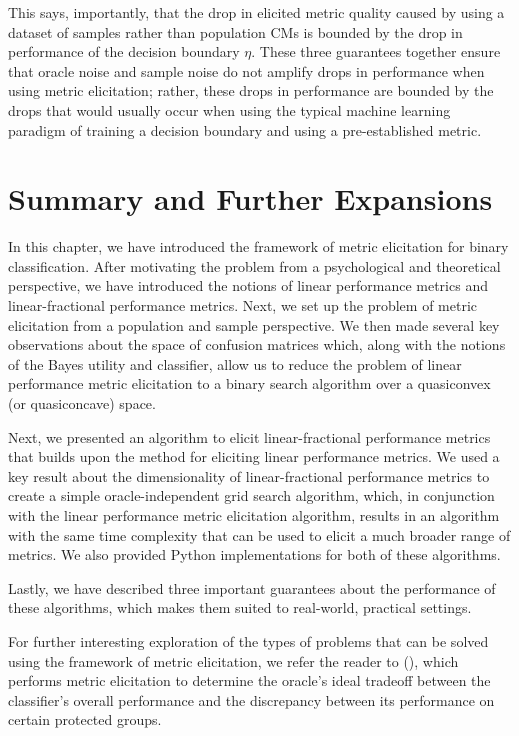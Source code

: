 \documentclass[
  letterpaper,
  DIV=11,
  numbers=noendperiod,
  oneside]{scrreprt}
\theoremstyle{remark}
\begin{document}
This says, importantly, that the drop in elicited metric quality caused
by using a dataset of samples rather than population CMs is bounded by
the drop in performance of the decision boundary \(\eta\). These three
guarantees together ensure that oracle noise and sample noise do not
amplify drops in performance when using metric elicitation; rather,
these drops in performance are bounded by the drops that would usually
occur when using the typical machine learning paradigm of training a
decision boundary and using a pre-established metric.

\section{Summary and Further
Expansions}\label{summary-and-further-expansions}

In this chapter, we have introduced the framework of metric elicitation
for binary classification. After motivating the problem from a
psychological and theoretical perspective, we have introduced the
notions of linear performance metrics and linear-fractional performance
metrics. Next, we set up the problem of metric elicitation from a
population and sample perspective. We then made several key observations
about the space of confusion matrices which, along with the notions of
the Bayes utility and classifier, allow us to reduce the problem of
linear performance metric elicitation to a binary search algorithm over
a quasiconvex (or quasiconcave) space.

Next, we presented an algorithm to elicit linear-fractional performance
metrics that builds upon the method for eliciting linear performance
metrics. We used a key result about the dimensionality of
linear-fractional performance metrics to create a simple
oracle-independent grid search algorithm, which, in conjunction with the
linear performance metric elicitation algorithm, results in an algorithm
with the same time complexity that can be used to elicit a much broader
range of metrics. We also provided Python implementations for both of
these algorithms.

Lastly, we have described three important guarantees about the
performance of these algorithms, which makes them suited to real-world,
practical settings.

For further interesting exploration of the types of problems that can be
solved using the framework of metric elicitation, we refer the reader to
(), which
performs metric elicitation to determine the oracle's ideal tradeoff
between the classifier's overall performance and the discrepancy between
its performance on certain protected groups.
\end{document}
